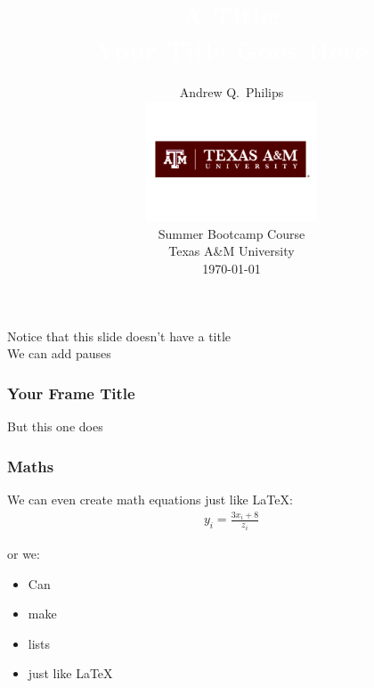 \documentclass[english,xcolor=dvipsnames]{beamer}
\title[2015 EITM]{\textcolor{white}{A Title:\\
Your Title Goes Here}}
\author[Philips 2015]{{\large Andrew Q.\ Philips}\\
\includegraphics[width=2in,height=1.4in]{TAM-PrimaryMarkA.png}\\
{\small  Summer Bootcamp Course \\
Texas A\&M University \\
	\today }}
\begin{document}
\frame{\titlepage}


\begin{frame}\frametitle{}
	Notice that this slide doesn't have a title \\ 
	\pause\bigskip
	We can add pauses \\
\end{frame}

\begin{frame}\frametitle{Your Frame Title}
	But this one does  
\end{frame}

\begin{frame}\frametitle{Maths}
	We can even create math equations just like \LaTeX:
	\begin{align}
	y_{i}=\frac{3x_{i}+8}{z_{i}}
	\end{align}
	\pause
	
	or we:
	\begin{itemize}
		\item Can
		\item make
		\item lists
		\item just like \LaTeX
	\end{itemize}  
\end{frame}
\end{document}
